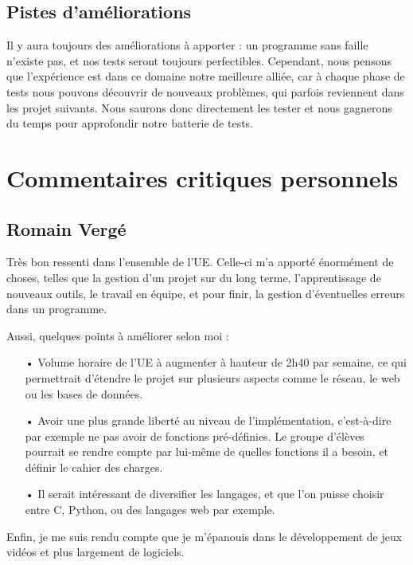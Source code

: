 \documentclass[12pt]{article}
\begin{document}
\subsection{Pistes d'améliorations}
Il y aura toujours des améliorations à apporter : un programme sans faille n'existe pas, et nos tests seront toujours perfectibles. Cependant, nous pensons que l'expérience est dans ce domaine notre meilleure alliée, car à chaque phase de tests nous pouvons découvrir de nouveaux problèmes, qui parfois reviennent dans les projet suivants. Nous saurons donc directement les tester et nous gagnerons du temps pour approfondir notre batterie de tests.

\section{Commentaires critiques personnels}
\subsection{Romain Vergé}
Très bon ressenti dans l'ensemble de l'UE. Celle-ci m'a apporté énormément de choses, telles que la gestion d'un projet sur du long terme, l'apprentissage de nouveaux outils, le travail en équipe, et pour finir, la gestion d'éventuelles erreurs dans un programme.

Aussi, quelques points à améliorer selon moi :
\begin{itemize}
\item[•] Volume horaire de l'UE à augmenter à hauteur de 2h40 par semaine, ce qui permettrait d'étendre le projet sur plusieurs aspects comme le réseau, le web ou les bases de données.

\item[•] Avoir une plus grande liberté au niveau de l'implémentation, c'est-à-dire par exemple ne pas avoir de fonctions pré-définies. Le groupe d'élèves pourrait se rendre compte par lui-même de quelles fonctions il a besoin, et définir le cahier des charges.

\item[•] Il serait intéressant de diversifier les langages, et que l'on puisse choisir entre C, Python, ou des langages web par exemple. 
\end{itemize}

Enfin, je me suis rendu compte que je m'épanouis dans le développement de jeux vidéos et plus largement de logiciels.
\end{document}

